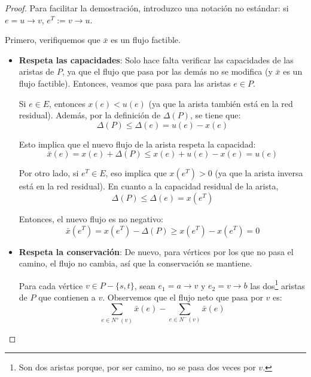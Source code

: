 \documentclass[a4paper]{report}
\begin{document}
\begin{proof}
    Para facilitar la demostración, introduzco una notación no estándar: si $e = u \rightarrow v$, $e^T := v \rightarrow u$.

    Primero, verifiquemos que $\bar{x}$ es un flujo factible.
    \begin{itemize}
        \item \textbf{Respeta las capacidades}: Solo hace falta verificar las capacidades de las aristas de $P$, ya que el flujo que pasa por las demás no se modifica (y $\bar{x}$ es un flujo factible). Entonces, veamos que pasa para las aristas $e \in P$.

        Si $e \in E$, entonces $x(e) < u(e)$ (ya que la arista también está en la red residual). Además, por la definición de $\Delta(P)$, se tiene que:
        $$\Delta(P) \leq \Delta(e) = u(e) - x(e)$$

        Esto implica que el nuevo flujo de la arista respeta la capacidad:
        $$\bar{x}(e) = x(e) + \Delta(P) \leq x(e) + u(e) - x(e) = u(e)$$

        Por otro lado, si $e^T \in E$, eso implica que $x(e^T) > 0$ (ya que la arista inversa está en la red residual). En cuanto a la capacidad residual de la arista,
        $$\Delta(P) \leq \Delta(e) = x(e^T)$$

        Entonces, el nuevo flujo es no negativo:
        $$\bar{x}(e^T) = x(e^T) - \Delta(P) \geq x(e^T) - x(e^T) = 0$$

        \item \textbf{Respeta la conservación}: De nuevo, para vértices por los que no pasa el camino, el flujo no cambia, así que la conservación se mantiene.
        
        Para cada vértice $v \in P - \{s, t\}$, sean $e_1 = a \rightarrow v$ y $e_2 = v \rightarrow b$ las dos\footnote{Son dos aristas porque, por ser camino, no se pasa dos veces por $v$.} aristas de $P$ que contienen a $v$. Observemos que el flujo neto que pasa por $v$ es:
            $$\sum_{e \in N^+(v)} \bar{x}(e) - \sum_{e \in N^-(v)} \bar{x}(e)$$


\end{itemize}
\end{proof}
\end{document}
